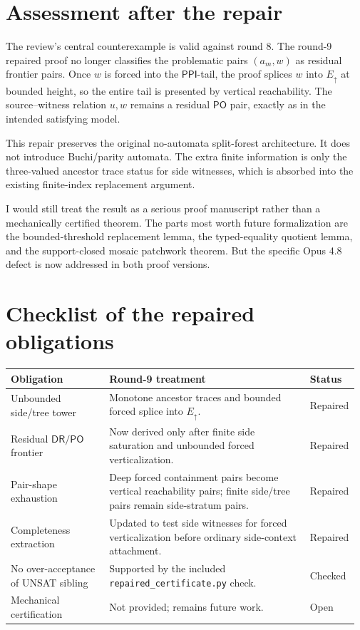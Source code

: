 \documentclass[11pt]{article}
\newcommand{\DR}{\mathsf{DR}}
\newcommand{\PO}{\mathsf{PO}}
\newcommand{\PPI}{\mathsf{PPI}}
\begin{document}
\section{Assessment after the repair}

The review's central counterexample is valid against round 8.  The round-9 repaired proof no longer classifies the problematic pairs \((a_m,w)\) as residual frontier pairs.  Once \(w\) is forced into the \(\PPI\)-tail, the proof splices \(w\) into \(E_{\uparrow}\) at bounded height, so the entire tail is presented by vertical reachability.  The source--witness relation \(u,w\) remains a residual \(\PO\) pair, exactly as in the intended satisfying model.

This repair preserves the original no-automata split-forest architecture.  It does not introduce Buchi/parity automata.  The extra finite information is only the three-valued ancestor trace status for side witnesses, which is absorbed into the existing finite-index replacement argument.

I would still treat the result as a serious proof manuscript rather than a mechanically certified theorem.  The parts most worth future formalization are the bounded-threshold replacement lemma, the typed-equality quotient lemma, and the support-closed mosaic patchwork theorem.  But the specific Opus 4.8 defect is now addressed in both proof versions.

\section{Checklist of the repaired obligations}

\begin{center}
\renewcommand{\arraystretch}{1.2}
\begin{tabular}{p{0.29\linewidth}p{0.58\linewidth}p{0.10\linewidth}}
\toprule
Obligation & Round-9 treatment & Status \\
\midrule
Unbounded side/tree tower & Monotone ancestor traces and bounded forced splice into \(E_{\uparrow}\). & Repaired \\
Residual \(\DR/\PO\) frontier & Now derived only after finite side saturation and unbounded forced verticalization. & Repaired \\
Pair-shape exhaustion & Deep forced containment pairs become vertical reachability pairs; finite side/tree pairs remain side-stratum pairs. & Repaired \\
Completeness extraction & Updated to test side witnesses for forced verticalization before ordinary side-context attachment. & Repaired \\
No over-acceptance of UNSAT sibling & Supported by the included \texttt{repaired\_certificate.py} check. & Checked \\
Mechanical certification & Not provided; remains future work. & Open \\
\bottomrule
\end{tabular}
\end{center}
\end{document}
